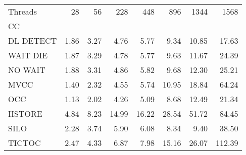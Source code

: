 \begin{tabular}{lrrrrrrr}
\toprule
Threads &  28   &  56   &  228  &  448  &  896  &  1344 &   1568 \\
CC        &       &       &       &       &       &       &        \\
\midrule
DL DETECT &  1.86 &  3.27 &  4.76 &  5.77 &  9.34 & 10.85 &  17.63 \\
WAIT DIE  &  1.87 &  3.29 &  4.78 &  5.77 &  9.63 & 11.67 &  24.39 \\
NO WAIT   &  1.88 &  3.31 &  4.86 &  5.82 &  9.68 & 12.30 &  25.21 \\
MVCC      &  1.40 &  2.32 &  4.55 &  5.74 & 10.95 & 18.84 &  64.24 \\
OCC       &  1.13 &  2.02 &  4.26 &  5.09 &  8.68 & 12.49 &  21.34 \\
HSTORE    &  4.84 &  8.23 & 14.99 & 16.22 & 28.54 & 51.72 &  84.45 \\
SILO      &  2.28 &  3.74 &  5.90 &  6.08 &  8.34 &  9.40 &  38.50 \\
TICTOC    &  2.47 &  4.33 &  6.87 &  7.98 & 15.16 & 26.07 & 112.39 \\
\bottomrule
\end{tabular}
